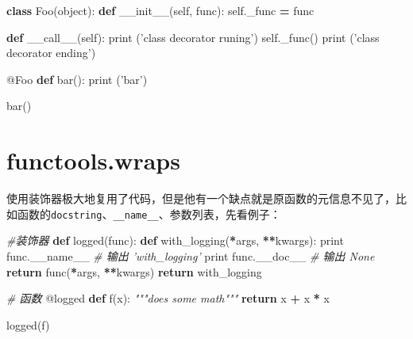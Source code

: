 \documentclass[]{ctexbook}
\newenvironment{Shaded}{\begin{snugshade}}{\end{snugshade}}
\newcommand{\AttributeTok}[1]{\textcolor[rgb]{0.77,0.63,0.00}{#1}}
\newcommand{\BuiltInTok}[1]{#1}
\newcommand{\CommentTok}[1]{\textcolor[rgb]{0.56,0.35,0.01}{\textit{#1}}}
\newcommand{\ControlFlowTok}[1]{\textcolor[rgb]{0.13,0.29,0.53}{\textbf{#1}}}
\newcommand{\FunctionTok}[1]{\textcolor[rgb]{0.00,0.00,0.00}{#1}}
\newcommand{\KeywordTok}[1]{\textcolor[rgb]{0.13,0.29,0.53}{\textbf{#1}}}
\newcommand{\NormalTok}[1]{#1}
\newcommand{\OperatorTok}[1]{\textcolor[rgb]{0.81,0.36,0.00}{\textbf{#1}}}
\newcommand{\StringTok}[1]{\textcolor[rgb]{0.31,0.60,0.02}{#1}}
\newcommand{\VariableTok}[1]{\textcolor[rgb]{0.00,0.00,0.00}{#1}}
\begin{document}
\begin{Shaded}
\begin{Highlighting}[]
\KeywordTok{class}\NormalTok{ Foo(}\BuiltInTok{object}\NormalTok{):}
    \KeywordTok{def} \FunctionTok{__init__}\NormalTok{(}\VariableTok{self}\NormalTok{, func):}
        \VariableTok{self}\NormalTok{._func }\OperatorTok{=}\NormalTok{ func}

    \KeywordTok{def} \FunctionTok{__call__}\NormalTok{(}\VariableTok{self}\NormalTok{):}
        \BuiltInTok{print}\NormalTok{ (}\StringTok{'class decorator runing'}\NormalTok{)}
        \VariableTok{self}\NormalTok{._func()}
        \BuiltInTok{print}\NormalTok{ (}\StringTok{'class decorator ending'}\NormalTok{)}

\AttributeTok{@Foo}
\KeywordTok{def}\NormalTok{ bar():}
    \BuiltInTok{print}\NormalTok{ (}\StringTok{'bar'}\NormalTok{)}

\NormalTok{bar()}
\end{Highlighting}
\end{Shaded}

\hypertarget{functools.wraps}{%
\section{functools.wraps}\label{functools.wraps}}

使用装饰器极大地复用了代码，但是他有一个缺点就是原函数的元信息不见了，比如函数的\texttt{docstring}、\texttt{\_\_name\_\_}、参数列表，先看例子：

\begin{Shaded}
\begin{Highlighting}[]
\CommentTok{#装饰器}
\KeywordTok{def}\NormalTok{ logged(func):}
    \KeywordTok{def}\NormalTok{ with_logging(}\OperatorTok{*}\NormalTok{args, }\OperatorTok{**}\NormalTok{kwargs):}
        \BuiltInTok{print}\NormalTok{ func.}\VariableTok{__name__}      \CommentTok{# 输出 'with_logging'}
        \BuiltInTok{print}\NormalTok{ func.__doc__       }\CommentTok{# 输出 None}
        \ControlFlowTok{return}\NormalTok{ func(}\OperatorTok{*}\NormalTok{args, }\OperatorTok{**}\NormalTok{kwargs)}
    \ControlFlowTok{return}\NormalTok{ with_logging}

\CommentTok{# 函数}
\AttributeTok{@logged}
\KeywordTok{def}\NormalTok{ f(x):}
   \CommentTok{"""does some math"""}
   \ControlFlowTok{return}\NormalTok{ x }\OperatorTok{+}\NormalTok{ x }\OperatorTok{*}\NormalTok{ x}

\NormalTok{logged(f)}
\end{Highlighting}
\end{Shaded}
\end{document}
